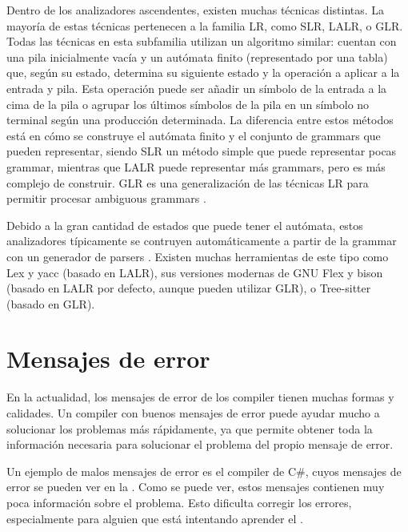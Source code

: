Dentro de los analizadores ascendentes, existen muchas técnicas distintas. La
mayoría de estas técnicas pertenecen a la familia LR, como SLR, LALR, o GLR.
Todas las técnicas en esta subfamilia utilizan un algoritmo similar: cuentan con
una pila inicialmente vacía y un autómata finito (representado por una tabla)
que, según su estado, determina su siguiente estado y la operación a aplicar a
la entrada y pila. Esta operación puede ser añadir un símbolo de la entrada a la
cima de la pila o agrupar los últimos símbolos de la pila en un símbolo no
terminal según una producción determinada. La diferencia entre estos métodos
está en cómo se construye el autómata finito y el conjunto de \glspl{grammar}
que pueden representar, siendo SLR un método simple que puede representar pocas
\gls{grammar}, mientras que LALR puede representar más \glspl{grammar}, pero es
más complejo de construir. \parencite{dragon-book} GLR es una generalización de
las técnicas LR para permitir procesar \glspl{ambiguous grammar}
\parencite{GLR-algorithm}.

Debido a la gran cantidad de estados que puede tener el autómata, estos
analizadores típicamente se contruyen automáticamente a partir de la
\gls{grammar} con un generador de \glspl{parser} \parencite{dragon-book}.
Existen muchas herramientas de este tipo como Lex y yacc \parencite{yacc}
(basado en LALR), sus versiones modernas de GNU Flex y bison \parencite{bison}
(basado en LALR por defecto, aunque pueden utilizar GLR), o Tree-sitter
\parencite{tree-sitter} (basado en GLR).

\section{Mensajes de error}\label{sec:error-messages}

En la actualidad, los mensajes de error de los \gls{compiler} tienen muchas
formas y calidades. Un \gls{compiler} con buenos mensajes de error puede ayudar
mucho a solucionar los problemas más rápidamente, ya que permite obtener toda la
información necesaria para solucionar el problema del propio mensaje de error.

Un ejemplo de malos mensajes de error es el \gls{compiler} de C\#, cuyos mensajes
de error se pueden ver en la . Como se puede ver, estos
mensajes contienen muy poca información sobre el problema. Esto dificulta
corregir los errores, especialmente para alguien que está intentando aprender el
.

